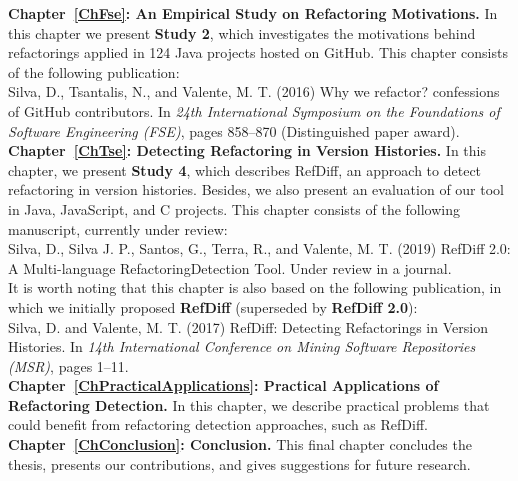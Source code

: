 \noindent\textbf{Chapter~\ref{ChFse}: An Empirical Study on Refactoring Motivations.} In this chapter we present \textbf{Study 2}, which investigates the motivations behind refactorings applied in 124 Java projects hosted on GitHub. This chapter consists of the following publication:
\\[6pt]
\noindent Silva, D., Tsantalis, N., and Valente, M. T. (2016) Why we refactor? confessions of GitHub contributors. In \emph{24th International Symposium on the Foundations of Software Engineering (FSE)}, pages 858--870 (Distinguished paper award).
\\[6pt]

\noindent\textbf{Chapter~\ref{ChTse}: Detecting Refactoring in Version Histories.} In this chapter, we present \textbf{Study 4}, which describes RefDiff, an approach to detect refactoring in version histories. Besides, we also present an evaluation of our tool in Java, JavaScript, and C projects. This chapter consists of the following manuscript, currently under review:
\\[6pt]
\noindent Silva, D., Silva J. P., Santos, G., Terra, R., and Valente, M. T. (2019) RefDiff 2.0: A Multi-language RefactoringDetection Tool. Under review in a journal.
\\[6pt]
It is worth noting that this chapter is also based on the following publication,  in which we initially proposed \textbf{RefDiff} (superseded by \textbf{RefDiff 2.0}):
\\[6pt]
\noindent Silva, D. and Valente, M. T. (2017) RefDiff: Detecting Refactorings in Version Histories. In \emph{14th International Conference on Mining Software Repositories (MSR)}, pages 1--11.
\\[6pt]

\noindent\textbf{Chapter~\ref{ChPracticalApplications}: Practical Applications of Refactoring Detection.} In this chapter, we describe practical problems that could benefit from refactoring detection approaches, such as RefDiff.
\\[6pt]

\noindent\textbf{Chapter~\ref{ChConclusion}: Conclusion.} This final chapter concludes the thesis, presents our contributions, and gives suggestions for future research.


